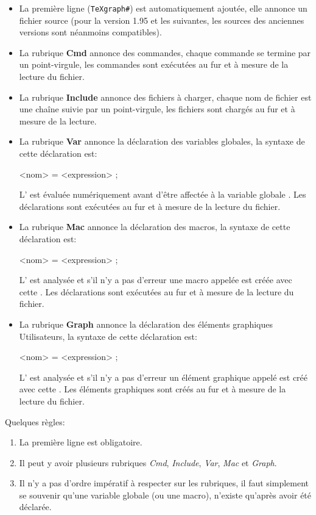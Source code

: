 \begin{itemize}
 \item La première ligne (\verb|TeXgraph#|) est automatiquement ajoutée, elle annonce un fichier source (pour la version 1.95 et les suivantes, les sources des anciennes versions sont néanmoins compatibles).

 \item La rubrique \textbf{Cmd} annonce des commandes, chaque commande se termine par un point-virgule, les commandes sont exécutées au fur et à mesure de la lecture du fichier.

 \item La rubrique \textbf{Include} annonce des fichiers à charger, chaque nom de fichier est une chaîne suivie par un point-virgule, les fichiers sont chargés au fur et à mesure de la lecture.

 \item La rubrique \textbf{Var} annonce la déclaration des variables globales, la syntaxe de cette déclaration est:

\centerline{<nom> = <expression> ;}

 L' est évaluée numériquement avant d'être affectée à la variable globale . Les déclarations sont exécutées au fur et à mesure de la lecture du fichier.

 \item La rubrique \textbf{Mac} annonce la déclaration des macros, la syntaxe de cette déclaration est:

\centerline{<nom> = <expression> ;}

 L' est analysée et s'il n'y a pas d'erreur une macro appelée  est créée avec cette . Les déclarations sont exécutées au fur et à mesure de la lecture du fichier.

 \item La rubrique \textbf{Graph} annonce la déclaration des éléments graphiques Utilisateurs, la syntaxe de cette déclaration est:

\centerline{<nom> = <expression> ;}

 L' est analysée et s'il n'y a pas d'erreur un élément graphique appelé  est créé avec cette . Les éléments graphiques sont créés au fur et à mesure de la lecture du fichier.
\end{itemize}

\medskip

Quelques règles:

\begin{enumerate}
 \item La première ligne est obligatoire.
 \item Il peut y avoir plusieurs rubriques \textit{Cmd}, \textit{Include}, \textit{Var}, \textit{Mac} et \textit{Graph}.
 \item Il n'y a pas d'ordre impératif à respecter sur les rubriques, il faut simplement se souvenir qu'une variable globale (ou une macro), n'existe qu'après avoir été déclarée. 
\end{enumerate}

